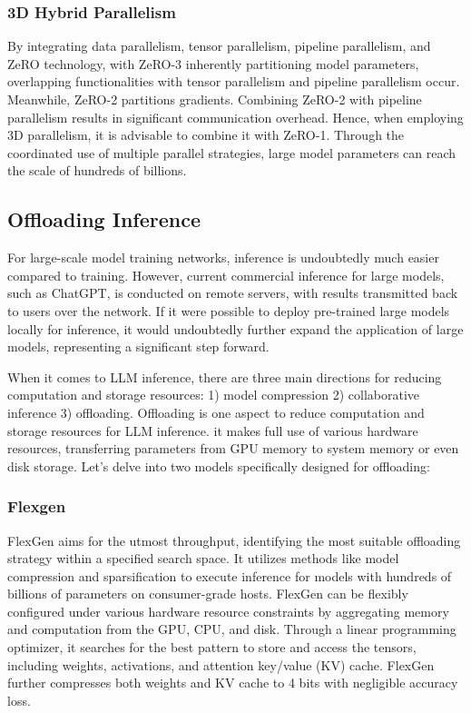 \documentclass[conference]{IEEEtran}
\begin{document}
\subsubsection{3D Hybrid Parallelism}
By integrating data parallelism, tensor parallelism, pipeline parallelism, and ZeRO technology, with ZeRO-3 inherently partitioning model parameters, overlapping functionalities with tensor parallelism and pipeline parallelism occur. Meanwhile, ZeRO-2 partitions gradients. Combining ZeRO-2 with pipeline parallelism results in significant communication overhead. Hence, when employing 3D parallelism, it is advisable to combine it with ZeRO-1.
Through the coordinated use of multiple parallel strategies, large model parameters can reach the scale of hundreds of billions.

\subsection{Offloading Inference}
For large-scale model training networks, inference is undoubtedly much easier compared to training. However, current commercial inference for large models, such as ChatGPT, is conducted on remote servers, with results transmitted back to users over the network. If it were possible to deploy pre-trained large models locally for inference, it would undoubtedly further expand the application of large models, representing a significant step forward.

When it comes to LLM inference, there are three main directions for reducing computation and storage resources:
1) model compression 2) collaborative inference 3) offloading.
Offloading is one aspect to reduce computation and storage resources for LLM inference. it makes full use of various hardware resources, transferring parameters from GPU memory to system memory or even disk storage.
Let's delve into two models specifically designed for offloading:

\subsubsection{Flexgen}
FlexGen\cite{b20} aims for the utmost throughput, identifying the most suitable offloading strategy within a specified search space. It utilizes methods like model compression and sparsification to execute inference for models with hundreds of billions of parameters on consumer-grade hosts.
FlexGen can be flexibly configured under various hardware resource constraints by aggregating memory and computation from the GPU, CPU, and disk. Through a linear programming optimizer, it searches for the best pattern to store and access the tensors, including weights, activations, and attention key/value (KV) cache. FlexGen further compresses both weights and KV cache to 4 bits with negligible accuracy loss.
\end{document}
